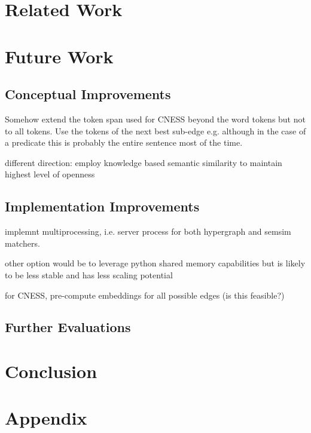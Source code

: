 \documentclass[11pt]{scrreprt}
\begin{document}



\chapter{Related Work}




\chapter{Future Work}
\section{Conceptual Improvements}
Somehow extend the token span used for CNESS beyond the word tokens but not to all tokens. Use the tokens of the next best sub-edge e.g. although in the case of a predicate this is probably the entire sentence most of the time.


different direction: employ knowledge based semantic similarity to maintain highest level of openness

\section{Implementation Improvements}
implemnt multiprocessing, i.e. server process for both hypergraph and semsim matchers. 

other option would be to leverage python shared memory capabilities but is likely to be less stable and has less scaling potential

for CNESS, pre-compute embeddings for all possible edges (is this feasible?)

\section{Further Evaluations}


\chapter{Conclusion}




\printbibliography
\appendix
\chapter{Appendix}

\end{document}

